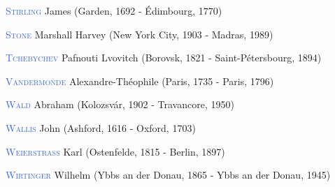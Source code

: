 \item \textcolor{RoyalBlue}{\textsc{Stirling}} James  (Garden, 1692 - Édimbourg, 1770)
\item \textcolor{RoyalBlue}{\textsc{Stone}} Marshall Harvey (New York City, 1903 - Madras, 1989)
\item \textcolor{RoyalBlue}{\textsc{Tchebychev}} Pafnouti Lvovitch (Borovsk, 1821 - Saint-Pétersbourg, 1894)
\item \textcolor{RoyalBlue}{\textsc{Vandermonde}} Alexandre-Théophile (Paris, 1735 - Paris, 1796)
\item \textcolor{RoyalBlue}{\textsc{Wald}} Abraham (Kolozsvár, 1902 - Travancore, 1950)
\item \textcolor{RoyalBlue}{\textsc{Wallis}} John  (Ashford, 1616 - Oxford, 1703)
\item \textcolor{RoyalBlue}{\textsc{Weierstrass}} Karl (Ostenfelde, 1815 - Berlin, 1897)
\item \textcolor{RoyalBlue}{\textsc{Wirtinger}} Wilhelm (Ybbs an der Donau, 1865 - Ybbs an der Donau, 1945)

